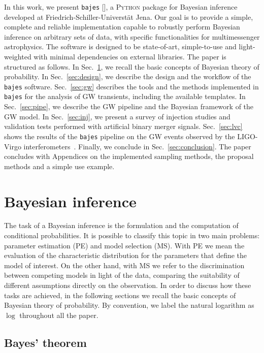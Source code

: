 \documentclass[prd,aps,twocolumn,a4paper,showkeys,nofootinbib,floatfix]{revtex4-1}
\newcommand{\bajes}{{\tt bajes}}
\newcommand{\py}{\textsc{Python}}
\begin{document}
In this work, we present 
{\bajes} [], a {\py} package for Bayesian
inference developed at Friedrich-Schiller-Universt\"at Jena.
Our goal is to provide a simple, complete and reliable
implementation capable to robustly perform Bayesian inference on
arbitrary sets of data, with specific functionalities for multimessenger astrophysics.
The software is designed to be state-of-art, simple-to-use and light-weighted
with minimal dependencies on external libraries.
The paper is structured as follows.
In Sec.~\ref{sec:inference}, we recall the basic concepts of Bayesian theory of 
probability.
In Sec.~\ref{sec:design}, we describe the design and the workflow of the {\bajes}
software.
Sec.~\ref{sec:gw} describes the tools and the methods implemented in {\bajes}
for the analysis of GW transients,
including the available templates.
In Sec.~\ref{sec:pipe}, we describe the GW pipeline and 
the Bayesian framework of the GW model. 
In Sec.~\ref{sec:inj}, we present a survey of injection studies and 
validation tests performed with artificial binary merger signals.
Sec.~\ref{sec:lvc} shows the results of the {\bajes} pipeline on the 
GW events observed by the LIGO-Virgo interferometers~\cite{LIGOScientific:2018mvr,Abbott:2019ebz}.
Finally, we conclude in Sec.~\ref{sec:conclusion}.
The paper concludes with Appendices on the implemented sampling methods, the proposal methods and a simple use example.

\section{Bayesian inference}
\label{sec:inference}

The task of a Bayesian inference is 
the formulation and the computation of conditional probabilities.
It is possible to classify this topic in two main problems:
parameter estimation (PE) and model selection (MS).
With PE we mean the evaluation 
of the characteristic distribution for the parameters that define the model of interest. 
On the other hand, with MS we refer to
the discrimination between competing models in light of the data,
comparing the suitability of different assumptions directly on the observation.
In order to discuss how these tasks are achieved, in the following sections
we recall the basic concepts of Bayesian theory of probability.
By convention, we label the natural logarithm as $\log$ throughout all the paper.

\subsection{Bayes' theorem}
\label{sec:bayes}
\end{document}
